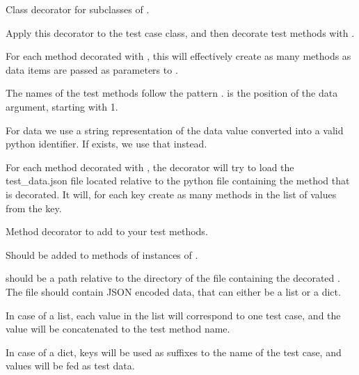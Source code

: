 \documentclass[letterpaper,10pt,english]{sphinxmanual}
\begin{document}

\begin{fulllineitems}
\label{ddt:ddt.ddt}
Class decorator for subclasses of .

Apply this decorator to the test case class, and then
decorate test methods with .

For each method decorated with , this will effectively create as
many methods as data items are passed as parameters to .

The names of the test methods follow the pattern
.  is the position of the
data argument, starting with 1.

For data we use a string representation of the data value converted into a
valid python identifier.  If  exists, we use that instead.

For each method decorated with , the
decorator will try to load the test\_data.json file located relative
to the python file containing the method that is decorated. It will,
for each  key create as many methods in the list of values
from the  key.

\end{fulllineitems}


\begin{fulllineitems}
\label{ddt:ddt.file_data}
Method decorator to add to your test methods.

Should be added to methods of instances of .

 should be a path relative to the directory of the file
containing the decorated . The file
should contain JSON encoded data, that can either be a list or a
dict.

In case of a list, each value in the list will correspond to one
test case, and the value will be concatenated to the test method
name.

In case of a dict, keys will be used as suffixes to the name of the
test case, and values will be fed as test data.

\end{fulllineitems}
\end{document}

